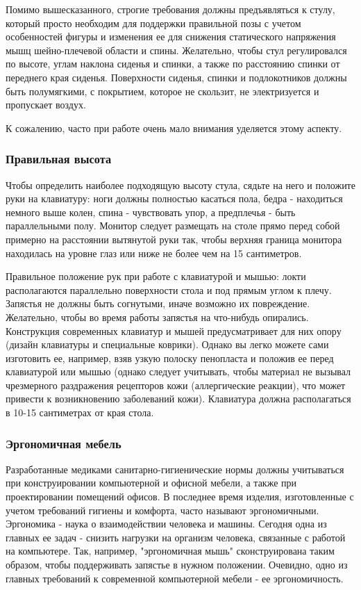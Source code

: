 \documentclass[russian,utf8,emptystyle]{eskdtext}
\begin{document}
\begin{spacing}{1.5}
Помимо вышесказанного, строгие требования должны предъявляться к стулу, который просто необходим для поддержки правильной позы с учетом особенностей фигуры и изменения ее для снижения статического напряжения мышц шейно-плечевой области и спины. Желательно, чтобы стул регулировался по высоте, углам наклона сиденья и спинки, а также по расстоянию спинки от переднего края сиденья. Поверхности сиденья, спинки и подлокотников должны быть полумягкими, с покрытием, которое не скользит, не электризуется и пропускает воздух.

К сожалению, часто при работе очень мало внимания уделяется этому аспекту.

\subsubsection{Правильная высота}
Чтобы определить наиболее подходящую высоту стула, сядьте на него и положите руки на клавиатуру: ноги должны полностью касаться пола, бедра - находиться немного выше колен, спина - чувствовать упор, а предплечья - быть параллельными полу. Монитор следует размещать на столе прямо перед собой примерно на расстоянии вытянутой руки так, чтобы верхняя граница монитора находилась на уровне глаз или ниже не более чем на 15 сантиметров. 

Правильное положение рук при работе с клавиатурой и мышью: локти располагаются параллельно поверхности стола и под прямым углом к плечу. Запястья не должны быть согнутыми, иначе возможно их повреждение. Желательно, чтобы во время работы запястья на что-нибудь опирались. Конструкция современных клавиатур и мышей предусматривает для них опору (дизайн клавиатуры и специальные коврики). Однако вы легко можете сами изготовить ее, например, взяв узкую полоску пенопласта и положив ее перед клавиатурой или мышью (однако следует учитывать, чтобы материал не вызывал чрезмерного раздражения рецепторов кожи (аллергические реакции), что может привести к возникновению заболеваний кожи). Клавиатура должна располагаться в 10-15 сантиметрах от края стола.

\subsubsection{Эргономичная мебель}
Разработанные медиками санитарно-гигиенические нормы должны учитываться при конструировании компьютерной и офисной мебели, а также при проектировании помещений офисов. В последнее время изделия, изготовленные с учетом требований гигиены и комфорта, часто называют эргономичными. Эргономика - наука о взаимодействии человека и машины. Сегодня одна из главных ее задач - снизить нагрузки на организм человека, связанные с работой на компьютере. Так, например, "эргономичная мышь" сконструирована таким образом, чтобы поддерживать запястье в нужном положении. Очевидно, одно из главных требований к современной компьютерной мебели - ее эргономичность.


\end{spacing}
\end{document}
